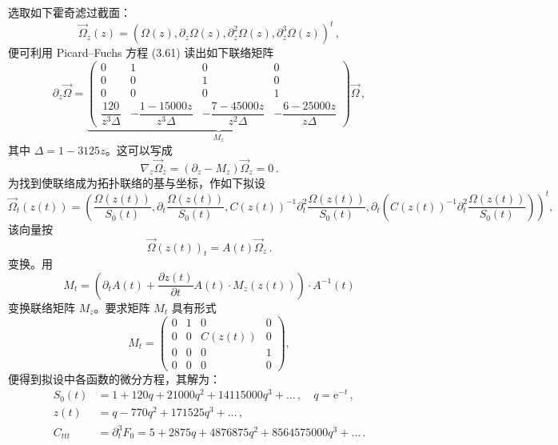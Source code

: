 选取如下霍奇滤过截面：
\begin{equation}\tag{3.64}
\vec{\Omega}_z(z)=(\Omega(z),\partial_z\Omega(z),\partial_z^2\Omega(z),\partial_z^3\Omega(z))^t\,,
\end{equation}
便可利用 Picard--Fuchs 方程 (3.61) 读出如下联络矩阵
\begin{equation}\tag{3.65}
\partial_z\vec{\Omega}=
\underbrace{
\begin{pmatrix}
0 & 1 & 0 & 0\\[2pt]
0 & 0 & 1 & 0\\[2pt]
0 & 0 & 0 & 1\\[4pt]
\dfrac{120}{z^3\Delta} & -\dfrac{1-15000z}{z^3\Delta} & -\dfrac{7-45000z}{z^2\Delta} & -\dfrac{6-25000z}{z\Delta}
\end{pmatrix}
}_{M_z}
\vec{\Omega}\,,
\end{equation}
其中 $\Delta=1-3125z$。这可以写成
\begin{equation}\tag{3.66}
\nabla_z\vec{\Omega}_z=(\partial_z-M_z)\vec{\Omega}_z=0\,.
\end{equation}
为找到使联络成为拓扑联络的基与坐标，作如下拟设
\begin{equation}\tag{3.67}
\vec{\Omega}_t(z(t))=\left(
\frac{\Omega(z(t))}{S_0(t)},
\partial_t\frac{\Omega(z(t))}{S_0(t)},
C(z(t))^{-1}\partial_t^2\frac{\Omega(z(t))}{S_0(t)},
\partial_t\left(C(z(t))^{-1}\partial_t^2\frac{\Omega(z(t))}{S_0(t)}\right)
\right)^t,
\end{equation}
该向量按
\[
\vec{\Omega}(z(t))_t=A(t)\vec{\Omega}_z\,.
\]
变换。用
\[
M_t=\left(\partial_tA(t)+\frac{\partial z(t)}{\partial t}A(t)\cdot M_z(z(t))\right)\cdot A^{-1}(t)
\]
变换联络矩阵 $M_z$。要求矩阵 $M_t$ 具有形式
\begin{equation}\tag{3.68}
M_t=
\begin{pmatrix}
0 & 1 & 0 & 0\\[2pt]
0 & 0 & C(z(t)) & 0\\[2pt]
0 & 0 & 0 & 1\\[2pt]
0 & 0 & 0 & 0
\end{pmatrix},
\end{equation}
便得到拟设中各函数的微分方程，其解为：
\[
\begin{aligned}
S_0(t)&=1+120q+21000q^2+14115000q^3+\dots\,,\quad q=\mathrm{e}^{-t}\,,\\
z(t)&=q-770q^2+171525q^3+\dots\,,\\
C_{ttt}&=\partial_t^3F_0=5+2875q+4876875q^2+8564575000q^3+\dots\,.
\end{aligned}
\]

